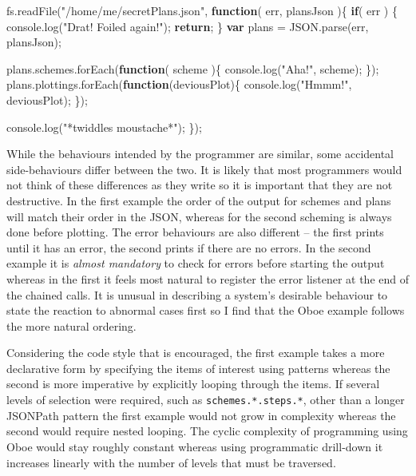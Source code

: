 \documentclass[12pt, ]{article}
\newenvironment{Shaded}{}{}
\newcommand{\KeywordTok}[1]{\textcolor[rgb]{0.00,0.44,0.13}{\textbf{{#1}}}}
\newcommand{\StringTok}[1]{\textcolor[rgb]{0.25,0.44,0.63}{{#1}}}
\newcommand{\OtherTok}[1]{\textcolor[rgb]{0.00,0.44,0.13}{{#1}}}
\newcommand{\FunctionTok}[1]{\textcolor[rgb]{0.02,0.16,0.49}{{#1}}}
\newcommand{\NormalTok}[1]{{#1}}
\begin{document}
\begin{Shaded}
\begin{Highlighting}[]
\OtherTok{fs}\NormalTok{.}\FunctionTok{readFile}\NormalTok{(}\StringTok{"/home/me/secretPlans.json"}\NormalTok{, }\KeywordTok{function}\NormalTok{( err, plansJson )\{     }
   \KeywordTok{if}\NormalTok{( err ) \{}
      \OtherTok{console}\NormalTok{.}\FunctionTok{log}\NormalTok{(}\StringTok{"Drat! Foiled again!"}\NormalTok{);}
      \KeywordTok{return}\NormalTok{;}
   \NormalTok{\}}
   \KeywordTok{var} \NormalTok{plans = }\OtherTok{JSON}\NormalTok{.}\FunctionTok{parse}\NormalTok{(err, plansJson);}
   
   \OtherTok{plans}\NormalTok{.}\OtherTok{schemes}\NormalTok{.}\FunctionTok{forEach}\NormalTok{(}\KeywordTok{function}\NormalTok{( scheme )\{}
      \OtherTok{console}\NormalTok{.}\FunctionTok{log}\NormalTok{(}\StringTok{"Aha!"}\NormalTok{, scheme);   }
   \NormalTok{\});   }
   \OtherTok{plans}\NormalTok{.}\OtherTok{plottings}\NormalTok{.}\FunctionTok{forEach}\NormalTok{(}\KeywordTok{function}\NormalTok{(deviousPlot)\{}
      \OtherTok{console}\NormalTok{.}\FunctionTok{log}\NormalTok{(}\StringTok{"Hmmm!"}\NormalTok{, deviousPlot);}
   \NormalTok{\});}
      
   \OtherTok{console}\NormalTok{.}\FunctionTok{log}\NormalTok{(}\StringTok{"*twiddles moustache*"}\NormalTok{);   }
\NormalTok{\});}
\end{Highlighting}
\end{Shaded}

While the behaviours intended by the programmer are similar, some
accidental side-behaviours differ between the two. It is likely that
most programmers would not think of these differences as they write so
it is important that they are not destructive. In the first example the
order of the output for schemes and plans will match their order in the
JSON, whereas for the second scheming is always done before plotting.
The error behaviours are also different -- the first prints until it has
an error, the second prints if there are no errors. In the second
example it is \emph{almost mandatory} to check for errors before
starting the output whereas in the first it feels most natural to
register the error listener at the end of the chained calls. It is
unusual in describing a system's desirable behaviour to state the
reaction to abnormal cases first so I find that the Oboe example follows
the more natural ordering.

Considering the code style that is encouraged, the first example takes a
more declarative form by specifying the items of interest using patterns
whereas the second is more imperative by explicitly looping through the
items. If several levels of selection were required, such as
\texttt{schemes.*.steps.*}, other than a longer JSONPath pattern the
first example would not grow in complexity whereas the second would
require nested looping. The cyclic complexity of programming using Oboe
would stay roughly constant whereas using programmatic drill-down it
increases linearly with the number of levels that must be traversed.
\end{document}
